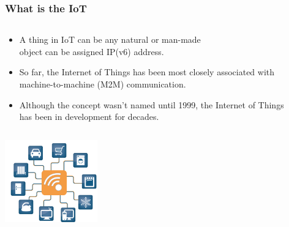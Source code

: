 \documentclass{beamer}
\begin{document}
\begin{frame}
	\frametitle{What is the IoT}
	\begin{columns}[c]
		\begin{column}{30cm}
			\vspace{.1cm}
			\begin{itemize}
				\justifying
				\item A \textcolor{TextGreen}{thing} in IoT can be any natural or man-made\\
				object can be assigned \textcolor{TextGreen}{IP(v6) address}.
				\item So far, the Internet of Things has been most closely associated with\\
				machine-to-machine (M2M) communication.
				\item Although the concept wasn't named until 1999, the Internet of Things\\
				has been in development for decades.
			\end{itemize}
		\end{column}
	\end{columns}
	\vspace{.5cm}
	\hspace*{7cm}\includegraphics[width=4cm]{figs/Internet-of-Things-4.jpg}
\end{frame}
\end{document}
